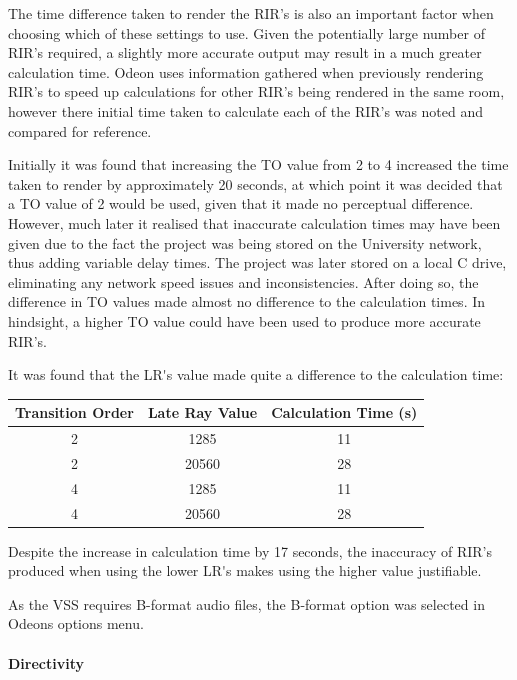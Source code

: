 \documentclass[../../main.tex]{subfiles}
\begin{document}
				The time difference taken to render the \ac{RIR}'s is also an important factor when choosing which of these settings to use. Given the potentially large number of \ac{RIR}'s required, a slightly more accurate output may result in a much greater calculation time. Odeon uses information gathered when previously rendering \ac{RIR}'s to speed up calculations for other \ac{RIR}'s being rendered in the same room, however there initial time taken to calculate each of the \ac{RIR}'s was noted and compared for reference.

				Initially it was found that increasing the \ac{TO} value from 2 to 4 increased the time taken to render by approximately 20 seconds, at which point it was decided that a \ac{TO} value of 2 would be used, given that it made no perceptual difference. However, much later it realised that inaccurate calculation times may have been given due to the fact the project was being stored on the University network, thus adding variable delay times. The project was later stored on a local C drive, eliminating any network speed issues and inconsistencies. After doing so, the difference in \ac{TO} values made almost no difference to the calculation times. In hindsight, a higher \ac{TO} value could have been used to produce more accurate \ac{RIR}'s.

				It was found that the \ac{LR's} value made quite a difference to the calculation time:

				\begin{center}
					\begin{tabular}{c c c}
					\textbf{Transition Order} & \textbf{Late Ray Value} & \textbf{Calculation Time (s)} \\ \hline
					2 & 1285 & 11 \\
					2 & 20560 & 28 \\
					4 & 1285 & 11 \\
					4 & 20560 & 28 \\
					\end{tabular}
				\end{center}

				Despite the increase in calculation time by 17 seconds, the inaccuracy of \ac{RIR}'s produced when using the lower \ac{LR's} makes using the higher value justifiable.

				As the \ac{VSS} requires B-format audio files, the B-format option was selected in Odeons options menu.



			\paragraph{Directivity}
\end{document}
